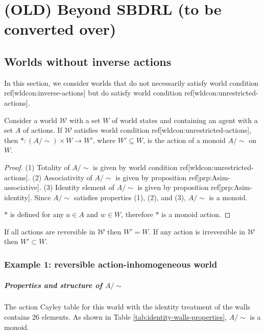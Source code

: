 \chapter{(OLD) Beyond SBDRL (to be converted over)}
\section{Worlds without inverse actions}

In this section, we consider worlds that do not necessarily satisfy world condition ref[wldcon:inverse-actions] but do satisfy world condition ref[wldcon:unrestricted-actions].

\begin{proposition}\label{prp:wc1_gives_monoid_action}
    Consider a world $\mathscr{W}$ with a set $W$ of world states and containing an agent with a set $A$ of actions.
    If $\mathscr{W}$ satisfies world condition ref[wldcon:unrestricted-actions], then $*: (A/\sim) \times W \to W'$, where $W' \subseteq W$, is the action of a monoid $A/\sim$ on $W$.
\end{proposition}
\begin{proof}
    (1) Totality of $A/\sim$ is given by world condition ref[wldcon:unrestricted-actions].
    (2) Associativity of $A/\sim$ is given by proposition ref[prp:Asim-associative].
    (3) Identity element of $A/\sim$ is given by proposition ref[prp:Asim-identity].
    Since $A/\sim$ satisfies properties (1), (2), and (3), $A/\sim$ is a monoid.
    
    $*$ is defined for any $a \in A$ and $w \in W$, therefore $*$ is a monoid action.
\end{proof}

\begin{remark}
    If all actions are reversible in $\mathscr{W}$ then $W' = W$.
    If any action is irreversible in $\mathscr{W}$ then $W' \subset W$.
\end{remark}

\subsection{Example 1: reversible action-inhomogeneous world}\label{sec:identity reversible action-inhomogeneous world}

\paragraph{Properties and structure of $A/\sim$}
The action Cayley table for this world with the identity treatment of the walls contains 26 elements.
As shown in Table \ref{tab:identity-walls-properties}, $A/\sim$ is a monoid.

